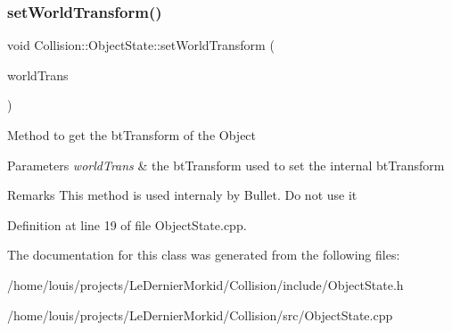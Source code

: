 \mbox{\label{class_collision_1_1_object_state_a7aeced5d3e1ae27eb7a31f2604ab227c}} 
\subsubsection{\texorpdfstring{set\+World\+Transform()}{setWorldTransform()}}
{\footnotesize\ttfamily void Collision\+::\+Object\+State\+::set\+World\+Transform (\begin{DoxyParamCaption}\item[{const bt\+Transform \&}]{world\+Trans }\end{DoxyParamCaption})\hspace{0.3cm}{\ttfamily [virtual]}}

Method to get the bt\+Transform of the Object 
\begin{DoxyParams}{Parameters}
{\em world\+Trans} & the bt\+Transform used to set the internal bt\+Transform \\
\hline
\end{DoxyParams}
\begin{DoxyRemark}{Remarks}
This method is used internaly by Bullet. Do not use it 
\end{DoxyRemark}


Definition at line 19 of file Object\+State.\+cpp.



The documentation for this class was generated from the following files\+:\begin{DoxyCompactItemize}
\item 
/home/louis/projects/\+Le\+Dernier\+Morkid/\+Collision/include/Object\+State.\+h\item 
/home/louis/projects/\+Le\+Dernier\+Morkid/\+Collision/src/Object\+State.\+cpp\end{DoxyCompactItemize}
